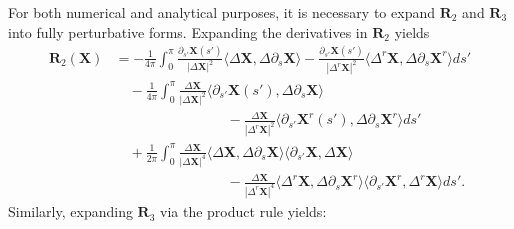 \documentclass{amsart}
\begin{document}
For both numerical and analytical purposes, it is necessary to expand $\mathbf{R}_2$ and $\mathbf{R}_3$ into fully perturbative forms. Expanding the derivatives in $\mathbf{R}_2$ yields
\begin{equation}\label{e:R2expanded}
\begin{split}
     \mathbf{R}_2(\mathbf{X})  
& = - \frac{1}{4\pi} \int_0^\pi
\frac{ \partial_{s'} \mathbf{X}(s') }{ |\Delta \mathbf{X}|^2} \langle \Delta \mathbf{X}, \Delta \partial_s \mathbf{X} \rangle  
- \frac{ \partial_{s'} \mathbf{X}(s') }{ |\Delta^r \mathbf{X}|^2} \langle \Delta^r \mathbf{X}, \Delta \partial_s \mathbf{X}^r \rangle ds' \\
& \quad - \frac{1}{4\pi} \int_0^\pi
\frac{\Delta \mathbf{X} }{ |\Delta \mathbf{X}|^2} 
\langle \partial_{s'} \mathbf{X}(s'), \Delta \partial_s \mathbf{X} \rangle  \\
& \qquad \qquad \qquad \qquad
-\frac{\Delta \mathbf{X} }{ |\Delta^r \mathbf{X}|^2} \langle \partial_{s'} \mathbf{X}^r(s'), \Delta \partial_s \mathbf{X}^r \rangle ds' \\
& \quad + \frac{1}{2\pi} \int_0^\pi \frac{ \Delta \mathbf{X} }{ |\Delta \mathbf{X}|^4} 
\langle \Delta \mathbf{X}, \Delta \partial_s \mathbf{X} \rangle
\langle \partial_{s'} \mathbf{X} , \Delta \mathbf{X} \rangle \\
& \qquad \qquad \qquad \qquad  
-\frac{ \Delta \mathbf{X} }{ |\Delta^r \mathbf{X}|^4} 
\langle \Delta^r \mathbf{X}, \Delta \partial_s \mathbf{X}^r \rangle
\langle \partial_{s'} \mathbf{X}^r , \Delta^r \mathbf{X} \rangle
ds'. 
\end{split}
\end{equation}
Similarly, expanding $\mathbf{R}_3$ via the product rule yields:
\end{document}

